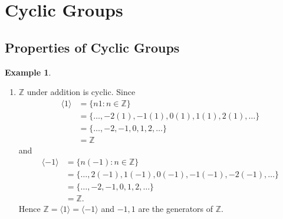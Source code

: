 \documentclass{article}
\theoremstyle{definition}
\newtheorem{definition}{Definition}[section]
\newtheorem{example}{Example}[section]
\begin{document}
\section{Cyclic Groups}
\subsection{Properties of Cyclic Groups}

\begin{example}
    \begin{enumerate}
        \item $\mathbb{Z}$ under addition is cyclic. Since
        \begin{align*}
            \langle 1 \rangle &= \{n1: n \in \mathbb{Z}\} \\
            &=  \{\dots, -2(1), -1(1), 0(1), 1(1), 2(1), \dots\} \\
            &= \{\dots, -2, -1, 0, 1, 2, \dots\} \\
            &= \mathbb{Z}
        \end{align*}
        and
        \begin{align*}
            \langle -1 \rangle &= \{n(-1): n \in \mathbb{Z}\} \\
            &=  \{\dots, 2(-1), 1(-1), 0(-1), -1(-1), -2(-1), \dots\} \\
            &= \{\dots, -2, -1, 0, 1, 2, \dots\} \\
            &= \mathbb{Z}.
        \end{align*}
        Hence $\mathbb{Z} = \langle 1 \rangle = \langle -1 \rangle$ and $-1,1$ are the generators of $\mathbb{Z}$.
        

\end{enumerate}
\end{example}
\end{document}
